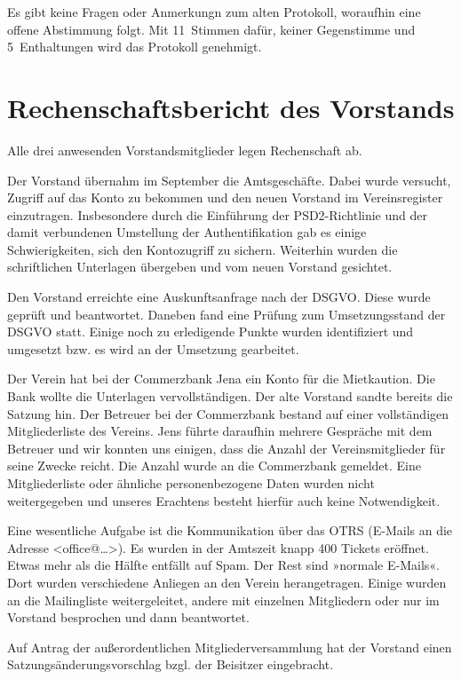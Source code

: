 \documentclass[DIV=calc,parksip=half*]{scrartcl}
\begin{document}
Es gibt keine Fragen oder Anmerkungn zum alten Protokoll, woraufhin eine offene Abstimmung folgt. Mit 11~Stimmen dafür, keiner Gegenstimme und 5~Enthaltungen wird das Protokoll genehmigt.
\section{Rechenschaftsbericht des Vorstands}

Alle drei anwesenden Vorstandsmitglieder legen Rechenschaft ab. 

Der Vorstand übernahm im September die Amtsgeschäfte. Dabei wurde versucht, Zugriff auf das Konto zu bekommen und den neuen Vorstand im Vereinsregister einzutragen. Insbesondere durch die Einführung der PSD2-Richtlinie und der damit verbundenen Umstellung der Authentifikation gab es einige Schwierigkeiten, sich den Kontozugriff zu sichern.
Weiterhin wurden die schriftlichen Unterlagen übergeben und vom neuen Vorstand gesichtet.

Den Vorstand erreichte eine Auskunftsanfrage nach der DSGVO. Diese wurde geprüft und beantwortet. Daneben fand eine Prüfung zum Umsetzungsstand der DSGVO statt. Einige noch zu erledigende Punkte wurden identifiziert und umgesetzt bzw. es wird an der Umsetzung gearbeitet.

Der Verein hat bei der Commerzbank Jena ein Konto für die Mietkaution. Die Bank wollte die Unterlagen vervollständigen. Der alte Vorstand sandte bereits die Satzung hin. Der Betreuer bei der Commerzbank bestand auf einer vollständigen Mitgliederliste des Vereins. Jens führte daraufhin mehrere Gespräche mit dem Betreuer und wir konnten uns einigen, dass die Anzahl der Vereinsmitglieder für seine Zwecke reicht. Die Anzahl wurde an die Commerzbank gemeldet. Eine Mitgliederliste oder ähnliche personenbezogene Daten wurden nicht weitergegeben und unseres Erachtens besteht hierfür auch keine Notwendigkeit.

Eine wesentliche Aufgabe ist die Kommunikation über das OTRS (E-Mails an die Adresse <office@…>). Es wurden in der Amtszeit knapp 400 Tickets eröffnet. Etwas mehr als die Hälfte entfällt auf Spam. Der Rest sind »normale E-Mails«. Dort wurden verschiedene Anliegen an den Verein herangetragen. Einige wurden an die Mailingliste weitergeleitet, andere mit einzelnen Mitgliedern oder nur im Vorstand besprochen und dann beantwortet.

Auf Antrag der außerordentlichen Mitgliederversammlung hat der Vorstand einen Satzungsänderungsvorschlag bzgl. der Beisitzer eingebracht. 
\end{document}
